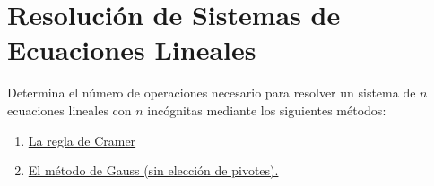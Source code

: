\section{Resolución de Sistemas de Ecuaciones Lineales}
\label{sec:Rel2}

\begin{ejercicio}
   Determina el número de operaciones necesario para resolver un sistema de $n$ ecuaciones lineales con $n$ incógnitas mediante los siguientes métodos:

   \begin{enumerate}
       \item \underline{La regla de Cramer}

       \item \underline{El método de Gauss (sin elección de pivotes).}
   \end{enumerate}
\end{ejercicio}

